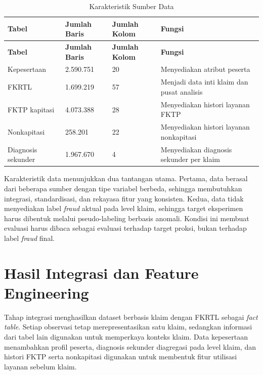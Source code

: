 \begin{longtable}[]{@{}p{}p{}p{}p{}@{}}
\caption{Karakteristik Sumber Data}\label{tab:karakteristik-sumber-data}\\
\toprule
\textbf{Tabel} & \textbf{Jumlah Baris} & \textbf{Jumlah Kolom} & \textbf{Fungsi} \\
\midrule
\endfirsthead
\toprule
\textbf{Tabel} & \textbf{Jumlah Baris} & \textbf{Jumlah Kolom} & \textbf{Fungsi} \\
\midrule
\endhead
\bottomrule
\endfoot
Kepesertaan & 2.590.751 & 20 & Menyediakan atribut peserta \\
FKRTL & 1.699.219 & 57 & Menjadi data inti klaim dan pusat analisis \\
FKTP kapitasi & 4.073.388 & 28 & Menyediakan histori layanan FKTP \\
Nonkapitasi & 258.201 & 22 & Menyediakan histori layanan nonkapitasi \\
Diagnosis sekunder & 1.967.670 & 4 & Menyediakan diagnosis sekunder per klaim \\
\end{longtable}

Karakteristik data menunjukkan dua tantangan utama. Pertama, data berasal dari beberapa sumber dengan tipe variabel berbeda, sehingga membutuhkan integrasi, standardisasi, dan rekayasa fitur yang konsisten. Kedua, data tidak menyediakan label \emph{fraud} aktual pada level klaim, sehingga target eksperimen harus dibentuk melalui pseudo-labeling berbasis anomali. Kondisi ini membuat evaluasi harus dibaca sebagai evaluasi terhadap target proksi, bukan terhadap label \emph{fraud} final.

\section{Hasil Integrasi dan Feature Engineering}\label{hasil-integrasi-dan-feature-engineering}

Tahap integrasi menghasilkan dataset berbasis klaim dengan FKRTL sebagai \emph{fact table}. Setiap observasi tetap merepresentasikan satu klaim, sedangkan informasi dari tabel lain digunakan untuk memperkaya konteks klaim. Data kepesertaan menambahkan profil peserta, diagnosis sekunder diagregasi pada level klaim, dan histori FKTP serta nonkapitasi digunakan untuk membentuk fitur utilisasi layanan sebelum klaim.

